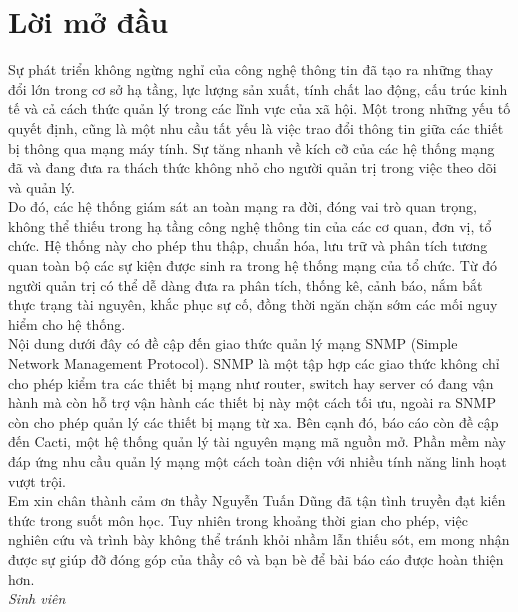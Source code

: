 \documentclass[12pt,oneside,a4paper]{article}
\begin{document}
	\setlength{\parindent}{0pt}

	\newpage
	\tableofcontents
	\newpage
	

\section*{Lời mở đầu}
%
Sự phát triển không ngừng nghỉ của công nghệ thông tin đã tạo ra những thay đổi lớn trong cơ sở hạ tầng, lực lượng sản xuất, tính chất lao động, cấu trúc kinh tế và cả cách thức quản lý trong các lĩnh vực của xã hội. Một trong những yếu tố quyết định, cũng là một nhu cầu tất yếu là việc trao đổi thông tin giữa các thiết bị thông qua mạng máy tính. Sự tăng nhanh về kích cỡ của các hệ thống mạng đã và đang đưa ra thách thức không nhỏ cho người quản trị trong việc theo dõi và quản lý.\\

Do đó, các hệ thống giám sát an toàn mạng ra đời, đóng vai trò quan trọng, không thể thiếu trong hạ tầng công nghệ thông tin của các cơ quan, đơn vị, tổ chức. Hệ thống này cho phép thu thập, chuẩn hóa, lưu trữ và phân tích tương quan toàn bộ các sự kiện được sinh ra trong hệ thống mạng của tổ chức. Từ đó người quản trị có thể dễ dàng đưa ra phân tích, thống kê, cảnh báo, nắm bắt thực trạng tài nguyên, khắc phục sự cố, đồng thời ngăn chặn sớm các mối nguy hiểm cho hệ thống.\\

Nội dung dưới đây có đề cập đến giao thức quản lý mạng SNMP (Simple Network Management Protocol). SNMP là một tập hợp các giao thức không chỉ cho phép kiểm tra các thiết bị mạng như router, switch hay server có đang vận hành mà còn hỗ trợ vận hành các thiết bị này một cách tối ưu, ngoài ra SNMP còn cho phép quản lý các thiết bị mạng từ xa. Bên cạnh đó, báo cáo còn đề cập đến Cacti, một hệ thống quản lý tài nguyên mạng mã nguồn mở. Phần mềm này đáp ứng nhu cầu quản lý mạng một cách toàn diện với nhiều tính năng linh hoạt vượt trội.\\

Em xin chân thành cảm ơn thầy Nguyễn Tuấn Dũng đã tận tình truyền đạt kiến thức trong suốt môn học. Tuy nhiên trong khoảng thời gian cho phép, việc nghiên cứu và trình bày không thể tránh khỏi nhầm lẫn thiếu sót, em mong nhận được sự giúp đỡ đóng góp của thầy cô và bạn bè để bài báo cáo được hoàn thiện hơn.\\
\vspace{1cm}
\textit{Sinh viên}\\
\end{document}
